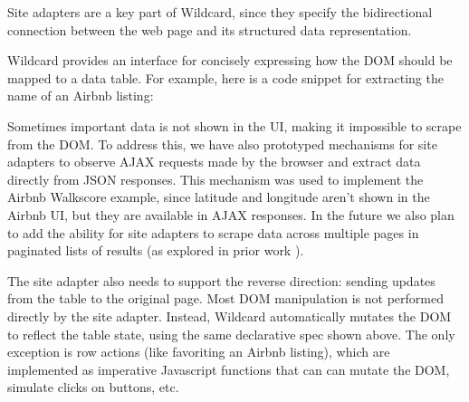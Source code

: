 \documentclass[english,submission]{programming}
\newenvironment{Shaded}{}{}
\newcommand{\CommentTok}[1]{\textcolor[rgb]{0.38,0.63,0.69}{\textit{#1}}}
\newcommand{\FunctionTok}[1]{\textcolor[rgb]{0.02,0.16,0.49}{#1}}
\newcommand{\KeywordTok}[1]{\textcolor[rgb]{0.00,0.44,0.13}{\textbf{#1}}}
\newcommand{\NormalTok}[1]{#1}
\newcommand{\OperatorTok}[1]{\textcolor[rgb]{0.40,0.40,0.40}{#1}}
\newcommand{\SpecialCharTok}[1]{\textcolor[rgb]{0.25,0.44,0.63}{#1}}
\newcommand{\StringTok}[1]{\textcolor[rgb]{0.25,0.44,0.63}{#1}}
\newcommand{\VariableTok}[1]{\textcolor[rgb]{0.10,0.09,0.49}{#1}}
\newcommand{\VerbatimStringTok}[1]{\textcolor[rgb]{0.25,0.44,0.63}{#1}}
\begin{document}
Site adapters are a key part of Wildcard, since they specify the
bidirectional connection between the web page and its structured data
representation.

Wildcard provides an interface for concisely expressing how the DOM
should be mapped to a data table. For example, here is a code snippet
for extracting the name of an Airbnb listing:

\begin{Shaded}
\end{Shaded}

Sometimes important data is not shown in the UI, making it impossible to
scrape from the DOM. To address this, we have also prototyped mechanisms
for site adapters to observe AJAX requests made by the browser and
extract data directly from JSON responses. This mechanism was used to
implement the Airbnb Walkscore example, since latitude and longitude
aren't shown in the Airbnb UI, but they are available in AJAX responses.
In the future we also plan to add the ability for site adapters to
scrape data across multiple pages in paginated lists of results (as
explored in prior work \autocite{huynh2006}).

The site adapter also needs to support the reverse direction: sending
updates from the table to the original page. Most DOM manipulation is
not performed directly by the site adapter. Instead, Wildcard
automatically mutates the DOM to reflect the table state, using the same
declarative spec shown above. The only exception is row actions (like
favoriting an Airbnb listing), which are implemented as imperative
Javascript functions that can can mutate the DOM, simulate clicks on
buttons, etc.
\end{document}
